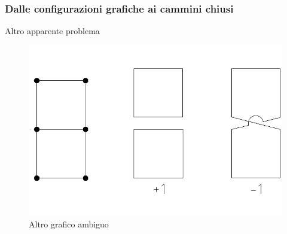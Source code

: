 \documentclass[11pt]{beamer}
\begin{document}
\begin{frame}
\frametitle{Dalle configurazioni grafiche ai cammini chiusi}
Altro apparente problema
\begin{figure}[r]
	\centering
	\includegraphics[width=0.7\columnwidth]{v2}
	\caption{Altro grafico ambiguo}
	\label{fig1}
	\end{figure}
\end{frame}
\end{document}
